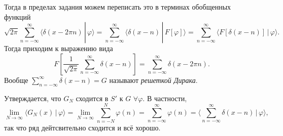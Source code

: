 Тогда в пределах задания можем переписать это в терминах обобщенных функций
\begin{equation*}
    \sqrt{2\pi} \sum_{n=-\infty}^{\infty}  \langle \delta(x-2\pi n) \,|\, \varphi \rangle  = \sum_{n=-\infty}^{\infty} 
    \langle \delta(x-n) \,|\, F[\varphi] \rangle  = \sum_{n=-\infty}^{\infty} \langle F[\delta(x-n)] \,|\, \varphi \rangle.
\end{equation*}
Тогда приходим к выражению вида
\begin{equation*}
    F\left[\frac{1}{\sqrt{2\pi}} \sum_{n=-\infty}^{\infty} \delta(x-n)\right] = \sum_{n=-\infty}^{\infty}  \delta(x-2 \pi n).
\end{equation*}
Вообще $\sum_{n=-\infty}^{\infty}  \delta(x-n) = G$ называют \textit{решеткой Дирака}. 


Утверждается, что $G_N$ сходится в $S'$ к $G$ $\forall \varphi$. В частности,
\begin{equation*}
    \lim_{N \to \infty} \langle G_N (x) \,|\, \varphi \rangle  = \lim_{N \to \infty} \sum_{n=-N}^{N} \varphi(n) = 
    \sum_{n=-\infty}^{\infty}  \varphi(n) = \bigg\langle \sum_{n=-\infty}^{\infty} \delta(x-n) \,\bigg|\, \varphi \bigg\rangle,
\end{equation*}
так что ряд дейтсвительно сходится и всё хорошо. 